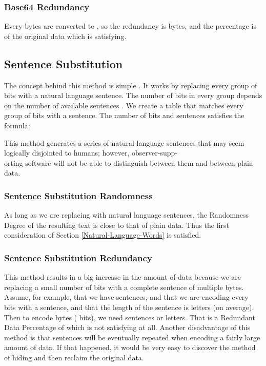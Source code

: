 \documentclass{acm_proc_article-sp}
\begin{document}
\subsubsection{Base64 Redundancy}\label{Base64-Redundancy}
Every  bytes are converted to , so the redundancy is  bytes, and the percentage is  of the original data which is satisfying.

\subsection{Sentence Substitution}\label{Sentence-Substitution}
The concept behind this method is simple \cite{Stamp}. It works by replacing every group of bits with a natural language sentence. The number of bits  in every group depends on the number of available sentences . We create a table that matches every group of bits with a sentence. The number of bits and sentences satisfies the formula:

This method generates a series of natural language sentences that may seem logically disjointed to humans; however, observer-supp-\\orting software will not be able to distinguish between them and between plain data.

\subsubsection{Sentence Substitution Randomness}\label{Sentence-Substitution-Randomness}
As long as we are replacing with natural language sentences, the Randomness Degree of the resulting text is close to that of plain data. Thus the first consideration of Section \ref{Natural-Language-Words} is satisfied.

\subsubsection{Sentence Substitution Redundancy}\label{Sentence-Substitution-Redundancy}
This method results in a big increase in the amount of data because we are replacing a small number of bits with a complete sentence of multiple bytes. Assume, for example, that we have  sentences, and that we are encoding every  bits with a sentence, and that the length of the sentence is  letters (on average). Then to encode  bytes ( bits), we need  sentences or  letters. That is a Redundant Data Percentage of  which is not satisfying at all. Another disadvantage of this method is that sentences will be eventually repeated when encoding a fairly large amount of data. If that happened, it would be very easy to discover the method of hiding and then reclaim the original data.
\end{document}
